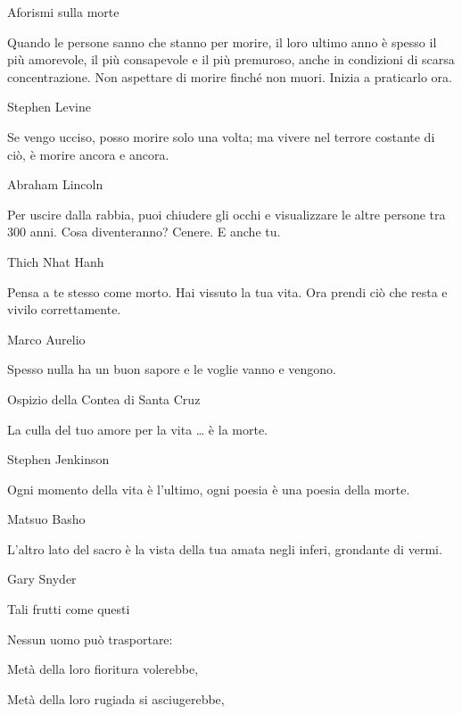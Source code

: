 \documentclass[12pt]{book} %
\begin{document}
\bigskip

\begin{mdframed}[linewidth=1pt]
Aforismi sulla morte


\bigskip

Quando le persone sanno che stanno per morire, il loro ultimo anno è spesso il più amorevole, il più consapevole e il
più premuroso, anche in condizioni di scarsa concentrazione. Non aspettare di morire finché non muori. Inizia a
praticarlo ora.

Stephen Levine


\bigskip

Se vengo ucciso, posso morire solo una volta; ma vivere nel terrore costante di ciò, è morire ancora e ancora.

Abraham Lincoln 


\bigskip

Per uscire dalla rabbia, puoi chiudere gli occhi e visualizzare le altre persone tra 300 anni. Cosa diventeranno?
Cenere. E anche tu.

Thich Nhat Hanh


\bigskip

Pensa a te stesso come morto. Hai vissuto la tua vita. Ora prendi ciò che resta e vivilo correttamente.

Marco Aurelio


\bigskip

Spesso nulla ha un buon sapore e le voglie vanno e vengono.

Ospizio della Contea di Santa Cruz


\bigskip

La culla del tuo amore per la vita … è la morte.

Stephen Jenkinson


\bigskip

Ogni momento della vita è l'ultimo, ogni poesia è una poesia della morte.

Matsuo Basho


\bigskip

L'altro lato del sacro è la vista della tua amata negli inferi, grondante di vermi.

Gary Snyder


\bigskip

Tali frutti come questi 

Nessun uomo può trasportare: 

Metà della loro fioritura volerebbe, 

Metà della loro rugiada si asciugerebbe, 


\end{mdframed}
\end{document}
